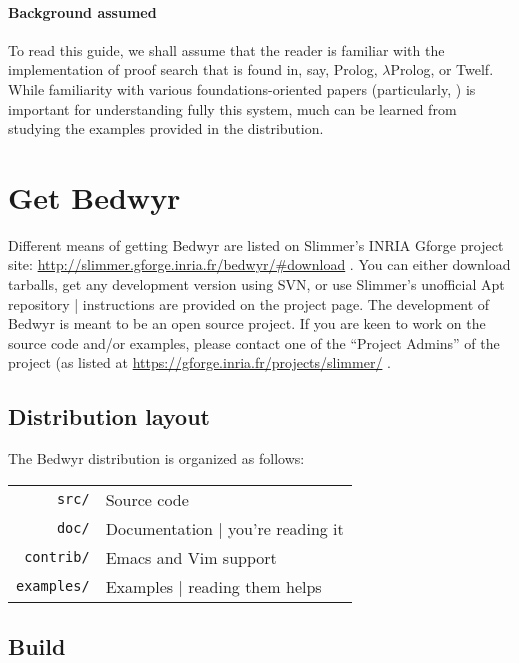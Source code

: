 \documentclass{article}
\newcommand{\lp}{$\lambda$Prolog}
\begin{document}
\paragraph{Background assumed}
To read this guide, we shall assume that the reader is familiar with
the implementation of proof search that is found in, say, Prolog, \lp{},
or Twelf.  While familiarity with various foundations-oriented papers
(particularly, \cite{mcdowell03tcs, miller05tocl,tiu04phd}) is
important for understanding fully this system, much can be learned
from studying the examples provided in the distribution.


\section{Get Bedwyr}

Different means of getting Bedwyr are listed on Slimmer's INRIA Gforge
project site:
\urldef{\thisurl}\url{http://slimmer.gforge.inria.fr/bedwyr/#download}
\ahrefurl{\thisurl}.
You can either download tarballs, get any development version using SVN,
or use Slimmer's unofficial Apt repository | instructions are provided
on the project page.
The development of Bedwyr is meant to be an open source project.
If you are keen to work on the source code and/or examples, please contact
one of the ``Project Admins'' of the project (as listed at
\urldef{\thisurl}\url{https://gforge.inria.fr/projects/slimmer/}
\ahrefurl{\thisurl}.

\subsection{Distribution layout}

The Bedwyr distribution is organized as follows:

\begin{tabular}{r@{\quad}l}
  \texttt{src/}      & Source code \\
  \texttt{doc/}      & Documentation | you're reading it \\
  \texttt{contrib/}  & Emacs and Vim support \\
  \texttt{examples/} & Examples | reading them helps
\end{tabular}

\subsection{Build}
\end{document}
